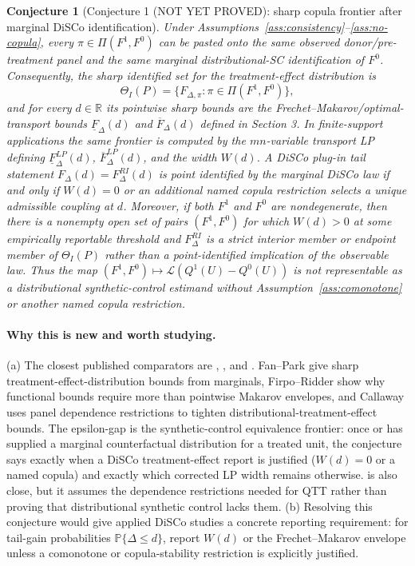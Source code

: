 \documentclass[11pt]{article}
\renewcommand{\Pr}{\mathbb{P}}
\newcommand{\R}{\mathbb{R}}
\theoremstyle{definition}
\theoremstyle{plain}
\newtheorem{conjecture}{Conjecture}
\theoremstyle{remark}
\begin{document}
\begin{conjecture}[Conjecture 1 (NOT YET PROVED): sharp copula frontier after marginal DiSCo identification]\label{conj:frontier}
Under Assumptions~\ref{ass:consistency}--\ref{ass:no-copula}, every \(\pi\in\Pi(F^1,F^0)\) can be pasted onto the same observed donor/pre-treatment panel and the same marginal distributional-SC identification of \(F^0\).  Consequently, the sharp identified set for the treatment-effect distribution is
\[
\Theta_I(P)=\{F_{\Delta,\pi}:\pi\in\Pi(F^1,F^0)\},
\]
and for every \(d\in\R\) its pointwise sharp bounds are the Frechet--Makarov/optimal-transport bounds \(\underline F_\Delta(d)\) and \(\overline F_\Delta(d)\) defined in Section 3.  In finite-support applications the same frontier is computed by the \(mn\)-variable transport LP defining \(\underline F_\Delta^{LP}(d)\), \(\overline F_\Delta^{LP}(d)\), and the width \(W(d)\).  A DiSCo plug-in tail statement \(F_\Delta(d)=F^{RI}_\Delta(d)\) is point identified by the marginal DiSCo law if and only if \(W(d)=0\) or an additional named copula restriction selects a unique admissible coupling at \(d\).  Moreover, if both \(F^1\) and \(F^0\) are nondegenerate, then there is a nonempty open set of pairs \((F^1,F^0)\) for which \(W(d)>0\) at some empirically reportable threshold and \(F^{RI}_\Delta\) is a strict interior member or endpoint member of \(\Theta_I(P)\) rather than a point-identified implication of the observable law.  Thus the map \((F^1,F^0)\mapsto\mathcal{L}(Q^1(U)-Q^0(U))\) is not representable as a distributional synthetic-control estimand without Assumption~\ref{ass:comonotone} or another named copula restriction.
\end{conjecture}
\paragraph{Why this is new and worth studying.}
(a) The closest published comparators are \cite{FanPark2010SharpBounds}, \cite{FirpoRidder2019Functionals}, and \cite{Callaway2021BoundsDTEPanel}.  Fan--Park give sharp treatment-effect-distribution bounds from marginals, Firpo--Ridder show why functional bounds require more than pointwise Makarov envelopes, and Callaway uses panel dependence restrictions to tighten distributional-treatment-effect bounds.  The epsilon-gap is the synthetic-control equivalence frontier: once \cite{Gunsilius2023DiSCo} or \cite{Chen2020DistributionalSC} has supplied a marginal counterfactual distribution for a treated unit, the conjecture says exactly when a DiSCo treatment-effect report is justified (\(W(d)=0\) or a named copula) and exactly which corrected LP width remains otherwise.  \cite{CallawayLi2019QTEDID} is also close, but it assumes the dependence restrictions needed for QTT rather than proving that distributional synthetic control lacks them.  (b) Resolving this conjecture would give applied DiSCo studies a concrete reporting requirement: for tail-gain probabilities \(\Pr\{\Delta\le d\}\), report \(W(d)\) or the Frechet--Makarov envelope unless a comonotone or copula-stability restriction is explicitly justified.
\end{document}
